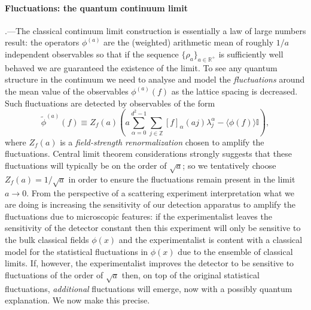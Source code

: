 \documentclass[prl,twocolumn,lengthcheck,superscriptaddress]{revtex4-1}
\theoremstyle{definition}
\theoremstyle{remark}
\begin{document}
\paragraph{Fluctuations: the quantum continuum limit}\hspace{-1em}.---The classical continuum limit construction is essentially a law of large numbers result: the operators $\phi^{(a)}$ are the (weighted) arithmetic mean of roughly $1/a$ independent observables so that if the sequence $\{\rho_a\}_{a\in\mathbb{R}^+}$ is sufficiently well behaved we are guaranteed the existence of the limit. To see any quantum structure in the continuum we need to analyse and model the \emph{fluctuations} around the mean value of the observables $\phi^{(a)}(f)$ as the lattice spacing is decreased. Such fluctuations are detected by observables of the form
\begin{equation}
	\widetilde{\phi}^{(a)}(f) \equiv Z_f(a)\left( a\sum_{\alpha=0}^{d^2-1}\sum_{j\in \mathbb{Z}} [f]_\alpha(aj) \lambda^\alpha_j - \langle\phi(f)\rangle\mathbb{I}\right),
\end{equation}
where $Z_f(a)$ is a \emph{field-strength renormalization} chosen to amplify the fluctuations. Central limit theorem considerations strongly suggests that these fluctuations will typically be on the order of $\sqrt{a}$; so we tentatively choose $Z_f(a) = 1/\sqrt{a}$ in order to ensure the fluctuations remain present in the limit $a\rightarrow 0$. From the perspective of a scattering experiment interpretation what we are doing is increasing the sensitivity of our detection apparatus to amplify the fluctuations due to microscopic features: if the experimentalist leaves the sensitivity of the detector constant then this experiment will only be sensitive to the bulk classical fields $\phi(x)$ and the experimentalist is content with a classical model for the statistical fluctuations in $\phi(x)$ due to the ensemble of classical limits. If, however, the experimentalist improves the detector to be sensitive to fluctuations of the order of $\sqrt{a}$ then, on top of the original statistical fluctuations, \emph{additional} fluctuations will emerge, now with a possibly quantum explanation. We now make this precise. 
\end{document}
